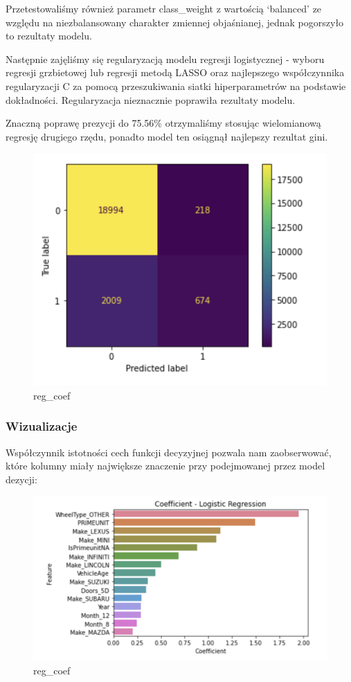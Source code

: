 \documentclass[11pt]{article}
\begin{document}
Przetestowaliśmy również parametr class\_weight z wartością `balanced'
ze względu na niezbalansowany charakter zmiennej objaśnianej, jednak
pogorszyło to rezultaty modelu.

Następnie zajęliśmy się regularyzacją modelu regresji logistycznej -
wyboru regresji grzbietowej lub regresji metodą LASSO oraz najlepszego
współczynnika regularyzacji C za pomocą przeszukiwania siatki
hiperparametrów na podstawie dokładności. Regularyzacja nieznacznie
poprawiła rezultaty modelu.

Znaczną poprawę prezycji do 75.56\% otrzymaliśmy stosując wielomianową
regresję drugiego rzędu, ponadto model ten osiągnął najlepszy rezultat
gini.

\begin{figure}
\centering
\includegraphics{plots/reg_confusion.png}
\caption{reg\_coef}
\end{figure}

\hypertarget{wizualizacje}{%
\subsubsection{Wizualizacje}\label{wizualizacje}}

Współczynnik istotności cech funkcji decyzyjnej pozwala nam
zaobserwować, które kolumny miały największe znaczenie przy podejmowanej
przez model dezycji:

\begin{figure}
\centering
\includegraphics{plots/reg_coef.png}
\caption{reg\_coef}
\end{figure}
\end{document}
